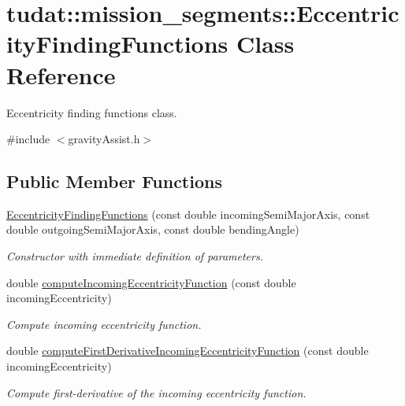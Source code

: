 \hypertarget{classtudat_1_1mission__segments_1_1EccentricityFindingFunctions}{}\section{tudat\+:\+:mission\+\_\+segments\+:\+:Eccentricity\+Finding\+Functions Class Reference}
\label{classtudat_1_1mission__segments_1_1EccentricityFindingFunctions}


Eccentricity finding functions class.  




{\ttfamily \#include $<$gravity\+Assist.\+h$>$}

\subsection*{Public Member Functions}
\begin{DoxyCompactItemize}
\item 
\hyperlink{classtudat_1_1mission__segments_1_1EccentricityFindingFunctions_a2181e6c239706a5b6ee73e1c0ac8d97c}{Eccentricity\+Finding\+Functions} (const double incoming\+Semi\+Major\+Axis, const double outgoing\+Semi\+Major\+Axis, const double bending\+Angle)
\begin{DoxyCompactList}\small\item\em Constructor with immediate definition of parameters. \end{DoxyCompactList}\item 
double \hyperlink{classtudat_1_1mission__segments_1_1EccentricityFindingFunctions_ab9b00ad2fe6116a3eba3fb89317fb5b5}{compute\+Incoming\+Eccentricity\+Function} (const double incoming\+Eccentricity)
\begin{DoxyCompactList}\small\item\em Compute incoming eccentricity function. \end{DoxyCompactList}\item 
double \hyperlink{classtudat_1_1mission__segments_1_1EccentricityFindingFunctions_a772c89f5575b47e6b8de0ff23a6eceb7}{compute\+First\+Derivative\+Incoming\+Eccentricity\+Function} (const double incoming\+Eccentricity)
\begin{DoxyCompactList}\small\item\em Compute first-\/derivative of the incoming eccentricity function. \end{DoxyCompactList}\end{DoxyCompactItemize}



